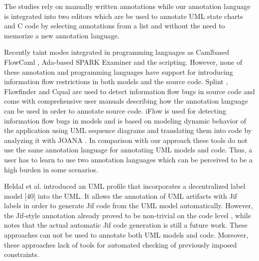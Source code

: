 The studies rely on manually
written annotations while our annotation language is integrated
into two editors which are be used to annotate UML state
charts and C code by selecting annotations from a list and
without the need to memorize a new annotation language.

Recently taint modes integrated in programming languages as Camlbased FlowCaml \cite{ref_32_simonet:report}, Ada-based SPARK Examiner \cite{ref_31_chapman:enforcing} and the scripting. However, none of these annotation and programming languages have support for introducing information flow
restrictions in both models and the source code.
Splint \cite{ref_30_david:splint}, Flawfinder \cite{ref_29_wheeler:flawfinder} and Cqual \cite{ref_28_umesh:cqual} are used to
detect information flow bugs in source code and come with
comprehensive user manuals describing how the annotation
language can be used in order to annotate source code.
iFlow \cite{ref_27_iflow:kuzman} is used for detecting information flow bugs in
models and is based on modeling dynamic behavior of the
application using UML sequence diagrams and translating
them into code by analyzing it with JOANA \cite{ref_26_kit:joana}. In comparison with our approach these tools do not use the same
annotation language for annotating UML models and code.
Thus, a user has to learn to use two annotation languages
which can be perceived to be a high burden in some scenarios.


 Heldal et al. \cite{ref_25_heldal:bridging,ref_23_heldal:supporting} introduced an
UML profile that incorporates a decentralized label model [40]
into the UML. It allows the annotation of UML artifacts with
Jif \cite{ref_24_myers:descentrelized} labels in order to generate Jif code from the UML
model automatically. However, the Jif-style annotation already
proved to be non-trivial on the code level \cite{ref_22_preibusch2011information}, while \cite{ref_23_heldal:supporting}
notes that the actual automatic Jif code generation is still a future
work. These approaches can not be used to annotate both UML
models and code. Moreover, these approaches lack of tools for
automated checking of previously imposed constraints.